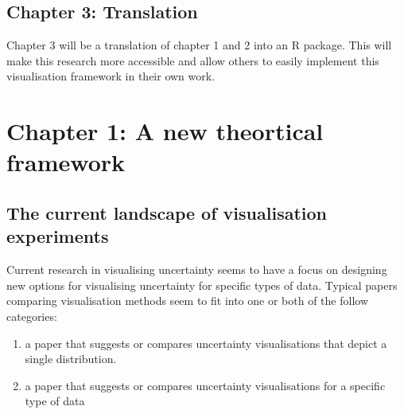 \documentclass[
  letterpaper,
  DIV=11,
  numbers=noendperiod]{scrartcl}
\begin{document}
\hypertarget{chapter-3-translation}{%
\subsection{Chapter 3: Translation}\label{chapter-3-translation}}

Chapter 3 will be a translation of chapter 1 and 2 into an R package.
This will make this research more accessible and allow others to easily
implement this visualisation framework in their own work.

\newpage{}

\hypertarget{chapter-1-a-new-theortical-framework}{%
\section{Chapter 1: A new theortical
framework}\label{chapter-1-a-new-theortical-framework}}

\hypertarget{the-current-landscape-of-visualisation-experiments}{%
\subsection{The current landscape of visualisation
experiments}\label{the-current-landscape-of-visualisation-experiments}}

Current research in visualising uncertainty seems to have a focus on
designing new options for visualising uncertainty for specific types of
data. Typical papers comparing visualisation methods seem to fit into
one or both of the follow categories:

\begin{enumerate}
\def\labelenumi{\arabic{enumi})}
\item
  a paper that suggests or compares uncertainty visualisations that
  depict a single distribution.
\item
  a paper that suggests or compares uncertainty visualisations for a
  specific type of data
\end{enumerate}
\end{document}
